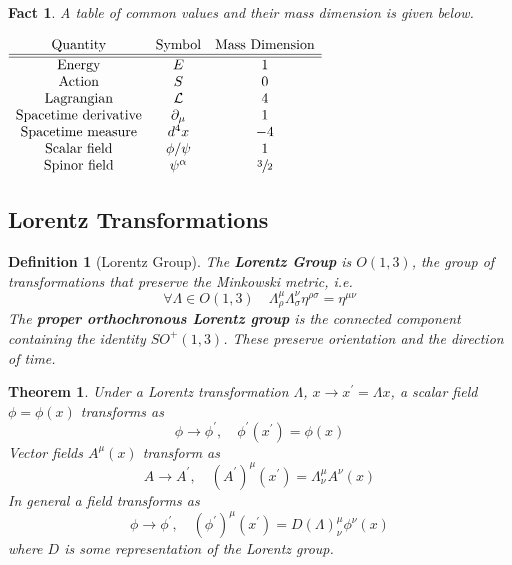 \documentclass{article}
\newtheorem{theorem}{Theorem}[subsection]
\newtheorem{definition}{Definition}[subsection]
\newtheorem{fact}{Fact}[subsection]
\newcommand{\del}{\partial}
\newcommand{\bam}[1]{\textbf{#1}}
\newcommand{\mc}[1]{\mathcal{#1}}
\begin{document}
\begin{fact}
A table of common values and their mass dimension is given below. 
\begin{center}$
\begin{array}{ccc}
    \text{Quantity} & \text{Symbol} & \text{Mass Dimension} \\
    \hline
    \hline
    \text{Energy} & E & 1 \\
    \text{Action} & S & 0 \\
    \text{Lagrangian} & \mc{L} & 4 \\
    \text{Spacetime derivative} & \del_\mu & 1 \\
    \text{Spacetime measure} & d^4x & -4 \\
    \text{Scalar field} & \phi/\psi & 1 \\
    \text{Spinor field} & \psi^\alpha & \sfrac{3}{2} \\ 
\end{array}
$\end{center}
\end{fact}

\subsection{Lorentz Transformations}

\begin{definition}[Lorentz Group]
The \bam{Lorentz Group} is $O(1,3)$, the group of transformations that preserve the Minkowski metric, i.e.
\[
\forall \Lambda\in O(1,3) \quad \Lambda^\mu_\rho \Lambda^\nu_\sigma \eta^{\rho\sigma}=\eta^{\mu\nu}
\]
The \bam{proper orthochronous Lorentz group} is the connected component containing the identity $SO^+(1,3)$. These preserve orientation and the direction of time. 
\end{definition}

\begin{theorem}
Under a Lorentz transformation $\Lambda$, $x\to x^\prime=\Lambda x$, a scalar field $\phi=\phi(x)$ transforms as 
\[
\phi\to\phi^\prime, \quad \phi^\prime(x^\prime)=\phi(x)
\]
Vector fields $A^\mu(x)$ transform as 
\[
A\to A^\prime, \quad \left(A^\prime\right)^\mu(x^\prime)=\Lambda^\mu_\nu A^\nu (x)
\]
In general a field transforms as 
\[
\phi\to\phi^\prime, \quad (\phi^\prime)^\mu(x^\prime)=D(\Lambda)^\mu_\nu \phi^\nu(x)
\]
where $D$ is some representation of the Lorentz group. 
\end{theorem}
\end{document}
